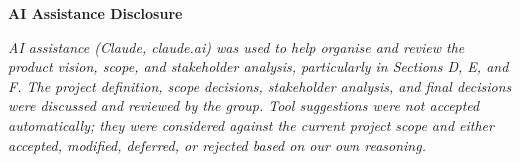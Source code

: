 \documentclass[11pt,a4paper]{article}
\begin{document}
\renewcommand{\arraystretch}{1}

\vspace{1.2em}

\noindent\textbf{AI Assistance Disclosure}

\noindent\textit{AI assistance (Claude, claude.ai) was used to help
organise and review the product vision, scope, and stakeholder
analysis, particularly in Sections D, E, and F. The project
definition, scope decisions, stakeholder analysis, and final
decisions were discussed and reviewed by the group. Tool suggestions
were not accepted automatically; they were considered against the
current project scope and either accepted, modified, deferred, or
rejected based on our own reasoning.}
\end{document}
